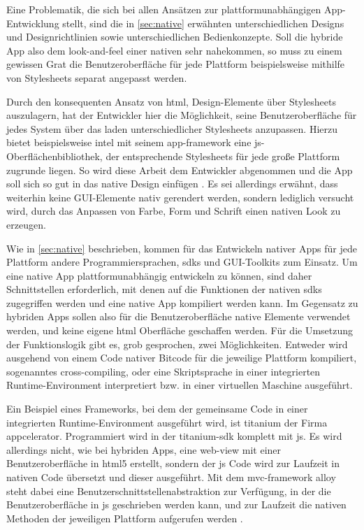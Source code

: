 Eine Problematik, die sich bei allen Ansätzen zur plattformunabhängigen App-Entwicklung stellt, sind die in \autoref{sec:native} erwähnten unterschiedlichen Designs und Designrichtlinien sowie unterschiedlichen Bedienkonzepte. Soll die hybride App also dem \gls{look-and-feel} einer nativen sehr nahekommen, so muss zu einem gewissen Grat die Benutzeroberfläche für jede Plattform beispielsweise mithilfe von Stylesheets separat angepasst werden.

Durch den konsequenten Ansatz von \gls{html}, Design-Elemente über Stylesheets auszulagern, hat der Entwickler hier die Möglichkeit, seine Benutzeroberfläche für jedes System über das laden unterschiedlicher Stylesheets anzupassen.
Hierzu bietet beispielsweise \gls{intel} mit seinem \gls{app-framework} eine \gls{js}-Oberflächenbibliothek, der entsprechende Stylesheets für jede große Plattform zugrunde liegen. So wird diese Arbeit dem Entwickler abgenommen und die App soll sich so gut in das native Design einfügen \cite{IntelAppFramework}.
Es sei allerdings erwähnt, dass weiterhin keine GUI-Elemente nativ gerendert werden, sondern lediglich versucht wird, durch das Anpassen von Farbe, Form und Schrift einen nativen Look zu erzeugen.

Wie in \autoref{sec:native} beschrieben, kommen für das Entwickeln nativer Apps für jede Plattform andere Programmiersprachen, \glspl{sdk} und GUI-Toolkits zum Einsatz. Um eine native App plattformunabhängig entwickeln zu können, sind daher Schnittstellen erforderlich, mit denen auf die Funktionen der nativen \glspl{sdk} zugegriffen werden und eine native App kompiliert werden kann. Im Gegensatz zu hybriden Apps sollen also für die Benutzeroberfläche native Elemente verwendet werden, und keine eigene \gls{html} Oberfläche geschaffen werden. Für die Umsetzung der Funktionslogik gibt es, grob gesprochen, zwei Möglichkeiten. Entweder wird ausgehend von einem Code nativer Bitcode für die jeweilige Plattform kompiliert, sogenanntes \gls{cross-compiling}, oder eine Skriptsprache in einer integrierten Runtime-Environment interpretiert bzw. in einer virtuellen Maschine ausgeführt.

Ein Beispiel eines Frameworks, bei dem der gemeinsame Code in einer integrierten Runtime-Environment ausgeführt wird, ist \gls{titanium} der Firma \gls{appcelerator}. Programmiert wird in der  \gls{titanium}-\gls{sdk} komplett mit \gls{js}. Es wird allerdings nicht, wie bei hybriden Apps, eine \gls{web-view} mit einer Benutzeroberfläche in \gls{html5} erstellt, sondern der \gls{js} Code wird zur Laufzeit in nativen Code übersetzt und dieser ausgeführt. Mit dem \gls{mvc}-\gls{framework} \gls{alloy} steht dabei eine Benutzerschnittstellenabstraktion zur Verfügung, in der die Benutzeroberfläche in \gls{js} geschrieben werden kann, und zur Laufzeit die nativen Methoden der jeweiligen Plattform aufgerufen werden \cite{kevinwhinnery, TitaniumAlloy}.

